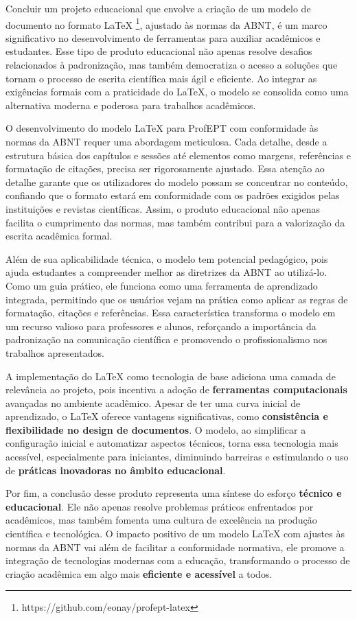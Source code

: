 Concluir um projeto educacional que envolve a criação de um modelo de documento no formato LaTeX \footnote{https://github.com/eonay/profept-latex}, ajustado às normas da ABNT, é um marco significativo no desenvolvimento de ferramentas para auxiliar acadêmicos e estudantes. Esse tipo de produto educacional não apenas resolve desafios relacionados à padronização, mas também democratiza o acesso a soluções que tornam o processo de escrita científica mais ágil e eficiente. Ao integrar as exigências formais com a praticidade do LaTeX, o modelo se consolida como uma alternativa moderna e poderosa para trabalhos acadêmicos.

O desenvolvimento do modelo LaTeX para ProfEPT com conformidade às normas da ABNT requer uma abordagem meticulosa. Cada detalhe, desde a estrutura básica dos capítulos e sessões até elementos como margens, referências e formatação de citações, precisa ser rigorosamente ajustado. Essa atenção ao detalhe garante que os utilizadores do modelo possam se concentrar no conteúdo, confiando que o formato estará em conformidade com os padrões exigidos pelas instituições e revistas científicas. Assim, o produto educacional não apenas facilita o cumprimento das normas, mas também contribui para a valorização da escrita acadêmica formal.

Além de sua aplicabilidade técnica, o modelo tem potencial pedagógico, pois ajuda estudantes a compreender melhor as diretrizes da ABNT ao utilizá-lo. Como um guia prático, ele funciona como uma ferramenta de aprendizado integrada, permitindo que os usuários vejam na prática como aplicar as regras de formatação, citações e referências. Essa característica transforma o modelo em um recurso valioso para professores e alunos, reforçando a importância da padronização na comunicação científica e promovendo o profissionalismo nos trabalhos apresentados.

A implementação do LaTeX como tecnologia de base adiciona uma camada de relevância ao projeto, pois incentiva a adoção de \textbf{ferramentas computacionais} avançadas no ambiente acadêmico. Apesar de ter uma curva inicial de aprendizado, o LaTeX oferece vantagens significativas, como \textbf{consistência e flexibilidade no design de documentos}. O modelo, ao simplificar a configuração inicial e automatizar aspectos técnicos, torna essa tecnologia mais acessível, especialmente para iniciantes, diminuindo barreiras e estimulando o uso de \textbf{práticas inovadoras no âmbito educacional}.

Por fim, a conclusão desse produto representa uma síntese do esforço \textbf{técnico e educacional}. Ele não apenas resolve problemas práticos enfrentados por acadêmicos, mas também fomenta uma cultura de excelência na produção científica e tecnológica. O impacto positivo de um modelo LaTeX com ajustes às normas da ABNT vai além de facilitar a conformidade normativa, ele promove a integração de tecnologias modernas com a educação, transformando o processo de criação acadêmica em algo mais \textbf{eficiente e acessível} a todos.








